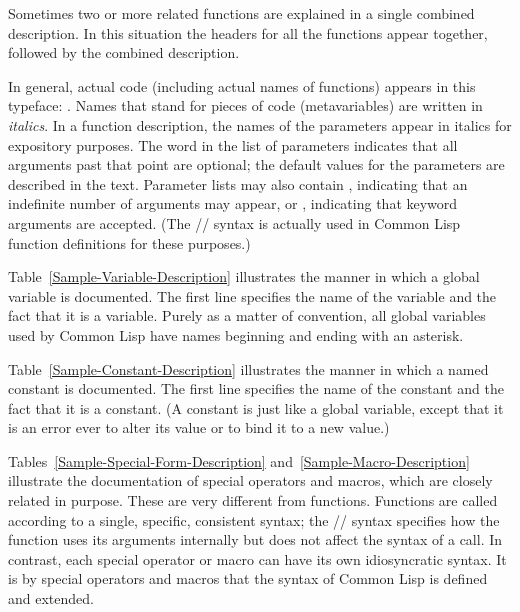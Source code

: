 Sometimes two or more related functions are explained in a single
combined description.  In this situation the headers for all the
functions appear together, followed by the combined description.

In general, actual code (including actual names of functions)
appears in this typeface: .
Names that stand for pieces of code (metavariables) are written in
\emph{italics}.  In a function description, the names of the parameters appear
in italics for expository purposes.  The word  in the
list of parameters indicates that all arguments past that point are
optional; the default values for the parameters are described in the
text.  Parameter lists may also contain , indicating that an
indefinite number of arguments may appear, or , indicating
that keyword arguments are accepted.
(The //
syntax is actually used in Common Lisp function definitions for these purposes.)

Table~\ref{Sample-Variable-Description} illustrates the manner in
which a global variable is documented.  The first line specifies the
name of the variable and the fact that it is a variable.
Purely as a matter of convention, all global variables used
by Common Lisp have names beginning and ending with an asterisk.

Table~\ref{Sample-Constant-Description} illustrates the manner in
which a named constant is documented.  The first line specifies the
name of the constant and the fact that it is a constant.
(A constant is just like a global variable, except that it is
an error ever to alter its value or to bind it to a new value.)

Tables~\ref{Sample-Special-Form-Description}
and~\ref{Sample-Macro-Description} illustrate the documentation
of special operators and macros, which are closely related in purpose.
These are very different from functions.
Functions are called according to a single, specific, consistent syntax;
the // syntax specifies how the function uses its arguments
internally but does not affect the syntax of a call.
In contrast, each special operator or macro can have its own idiosyncratic syntax.
It is by special operators and macros that the syntax of Common Lisp is defined
and extended.

